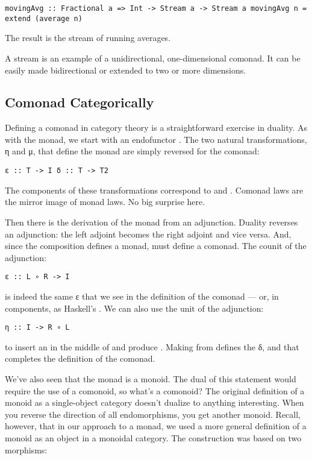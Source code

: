 \begin{verbatim}
movingAvg :: Fractional a => Int -> Stream a -> Stream a movingAvg n = extend (average n)
\end{verbatim}

The result is the stream of running averages.

A stream is an example of a unidirectional, one-dimensional comonad. It
can be easily made bidirectional or extended to two or more dimensions.

\subsection{Comonad Categorically}\label{comonad-categorically}

Defining a comonad in category theory is a straightforward exercise in
duality. As with the monad, we start with an endofunctor . The
two natural transformations, η and μ, that define the monad are simply
reversed for the comonad:

\begin{verbatim}
ε :: T -> I δ :: T -> T2
\end{verbatim}

The components of these transformations correspond to 
and . Comonad laws are the mirror image of monad laws.
No big surprise here.

Then there is the derivation of the monad from an adjunction. Duality
reverses an adjunction: the left adjoint becomes the right adjoint and
vice versa. And, since the composition  defines a monad,
 must define a comonad. The counit of the adjunction:

\begin{verbatim}
ε :: L ∘ R -> I
\end{verbatim}

is indeed the same ε that we see in the definition of the comonad ---
or, in components, as Haskell's . We can also use the
unit of the adjunction:

\begin{verbatim}
η :: I -> R ∘ L
\end{verbatim}

to insert an  in the middle of  and
produce . Making  from 
defines the δ, and that completes the definition of the comonad.

We've also seen that the monad is a monoid. The dual of this statement
would require the use of a comonoid, so what's a comonoid? The original
definition of a monoid as a single-object category doesn't dualize to
anything interesting. When you reverse the direction of all
endomorphisms, you get another monoid. Recall, however, that in our
approach to a monad, we used a more general definition of a monoid as an
object in a monoidal category. The construction was based on two
morphisms:

